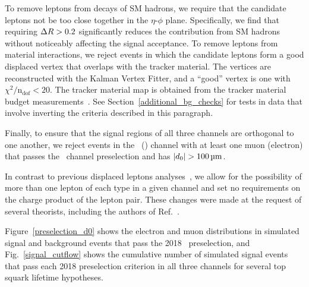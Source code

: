 

To remove leptons from decays of SM hadrons, we require that the candidate leptons not be too close together in the $\eta$-$\phi$ plane. Specifically, we find that requiring $\Delta R>0.2$ significantly reduces the contribution from SM hadrons without noticeably affecting the signal acceptance. To remove leptons from material interactions, we reject events in which the candidate leptons form a good displaced vertex that overlaps with the tracker material. The vertices are reconstructed with the Kalman Vertex Fitter, and a ``good'' vertex is one with $\chi^{2}/\mathrm{n_{dof}}< 20$. The tracker material map is obtained from the tracker material budget measurements~\cite{Sirunyan:2018icq,CMS-DP-2019-001}. See Section~\ref{additional_bg_checks} for tests in data that involve inverting the criteria described in this paragraph.

Finally, to ensure that the signal regions of all three channels are orthogonal to one another, we reject events in the \Pe\Pe\ (\Pgm\Pgm) channel with at least one muon (electron) that passes the \Pe\Pgm\ channel preselection and has $\ad>\SI{100}{\um}$.

In contrast to previous displaced leptons analyses~\cite{displaced_leptons_run1, displaced_leptons_bing}, we allow for the possibility of more than one lepton of each type in a given channel and set no requirements on the charge product of the lepton pair. These changes were made at the request of several theorists, including the authors of Ref.~\cite{Evans:2016zau}.

Figure~\ref{preselection_d0} shows the electron and muon \ad distributions in simulated signal and background events that pass the 2018 \Pe\Pgm\ preselection, and Fig.~\ref{signal_cutflow} shows the cumulative number of simulated signal events that pass each 2018 preselection criterion in all three channels for several top squark lifetime hypotheses.




